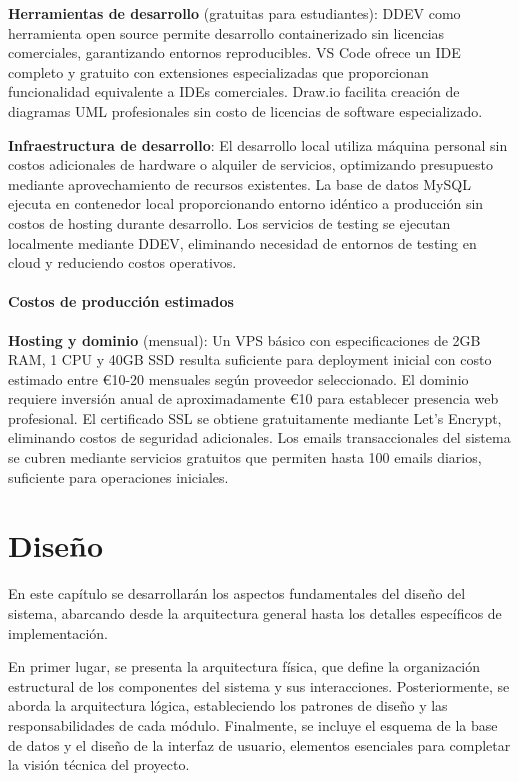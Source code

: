 \documentclass[12pt,a4paper,oneside]{report}
\begin{document}
\textbf{Herramientas de desarrollo} (gratuitas para estudiantes): DDEV como herramienta open source permite desarrollo containerizado sin licencias comerciales, garantizando entornos reproducibles. VS Code ofrece un IDE completo y gratuito con extensiones especializadas que proporcionan funcionalidad equivalente a IDEs comerciales. Draw.io facilita creación de diagramas UML profesionales sin costo de licencias de software especializado.

\textbf{Infraestructura de desarrollo}: El desarrollo local utiliza máquina personal sin costos adicionales de hardware o alquiler de servicios, optimizando presupuesto mediante aprovechamiento de recursos existentes. La base de datos MySQL ejecuta en contenedor local proporcionando entorno idéntico a producción sin costos de hosting durante desarrollo. Los servicios de testing se ejecutan localmente mediante DDEV, eliminando necesidad de entornos de testing en cloud y reduciendo costos operativos.

\subsubsection{Costos de producción
estimados}\label{costos-de-producciuxf3n-estimados}

\textbf{Hosting y dominio} (mensual): Un VPS básico con especificaciones de 2GB RAM, 1 CPU y 40GB SSD resulta suficiente para deployment inicial con costo estimado entre €10-20 mensuales según proveedor seleccionado. El dominio requiere inversión anual de aproximadamente €10 para establecer presencia web profesional. El certificado SSL se obtiene gratuitamente mediante Let's Encrypt, eliminando costos de seguridad adicionales. Los emails transaccionales del sistema se cubren mediante servicios gratuitos que permiten hasta 100 emails diarios, suficiente para operaciones iniciales.

\chapter{Diseño}\label{diseuxf1o}
En este capítulo se desarrollarán los aspectos fundamentales del diseño del sistema,
abarcando desde la arquitectura general hasta los detalles específicos
de implementación.

En primer lugar, se presenta la arquitectura física, que define la
organización estructural de los componentes del sistema y sus
interacciones. Posteriormente, se aborda la arquitectura lógica,
estableciendo los patrones de diseño y las responsabilidades de cada
módulo. Finalmente, se incluye el esquema de la base de datos y el
diseño de la interfaz de usuario, elementos esenciales para completar la
visión técnica del proyecto.
\end{document}
